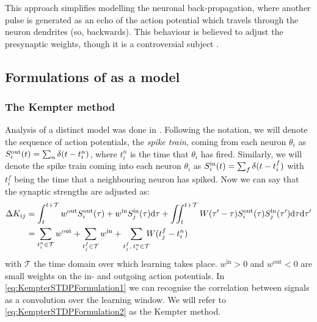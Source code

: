 
This approach simplifies modelling the neuronal back-propagation, where another pulse is generated as an echo of the action potential which travels through the neuron dendrites (so, backwards). This behaviour is believed to adjust the presynaptic weights, though it is a controversial subject \cite{Gerstner2002}. 


\subsection{Formulations of \STDP as a model}
\subsubsection{The Kempter method}
Analysis of a distinct \STDP model was done in \cite{Kempter1999}. Following the notation, we will denote the sequence of action potentials, the \textsl{spike train}, coming from each neuron $\theta_i$ as $S_i^{\rm out}(t) = \sum_{n} \delta (t-t_{i}^{n})$, where $t_{i}^{n}$ is the time that $\theta_i$ has fired. Similarly, we will denote the spike train coming into each neuron $\theta_i$ as $S_i^{\rm in}(t) = \sum_{f} \delta (t-t_{i}^{f})$ with $t_{i}^{f}$ being the time that a neighbouring neuron has spiked. Now we can say that the synaptic strengths are adjusted as:
\begin{align}
\Delta K_{ij} &= \int_{t}^{t+\mathcal{T}} w^{\rm{out}} S_i^{\rm out}(\tau) + w^{\rm{in}} S_{j}^{\rm {in}}(\tau) \mathrm{d}\tau
+ \iint_{t}^{t+\mathcal{T}} W( \tau^\prime - \tau) S_{i}^{\rm out}(\tau) S_{j}^{\rm in}( \tau^\prime) \mathrm{d} \tau \mathrm{d} \tau^\prime
\label{eq:KempterSTDPFormulation1} \\
&= \sum_{t_i^{n}\in \mathcal{T}} w^{\mathrm{out}} + \sum_{t_{j}^{f} \in \mathcal{T}} w^{\mathrm{in}} + \sum_{t_{j}^{f}, \: t_i^{n} \in \mathcal{T}} \hspace{-2mm} W (t_{j}^{f}-t_i^{n} ) \label{eq:KempterSTDPFormulation2}
\end{align}
with $\mathcal{T}$ the time domain over which learning takes place. $w^{\mathrm{in}} > 0$ and $w^{\mathrm{out}} < 0$ are small weights on the in- and outgoing action potentials. In \eqref{eq:KempterSTDPFormulation1} we can recognise the correlation between signals as a convolution over the learning window. We will refer to \eqref{eq:KempterSTDPFormulation2} as the Kempter method. \\

